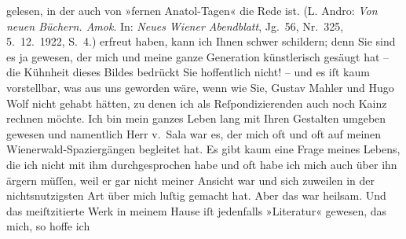 \begin{ledgroupsized}[t]{13cm}
{{{                  gelesen, in der auch von »fernen Anatol-Tagen« die Rede ist. (L. Andro: \emph{Von neuen Büchern. Amok}. In: \emph{Neues Wiener Abendblatt}, Jg. 56, Nr. 325,
                        5. 12. 1922, S. 4.)}}}\label{K_L02572-1h} erfreut haben, kann ich Ihnen
               schwer schildern; denn Sie sind es ja gewesen, der mich und meine ganze Generation
               künstlerisch gesäugt hat – die Kühnheit dieses Bildes bedrückt Sie hoffentlich nicht!
               – und es iſt kaum vorstellbar, was aus uns geworden wäre, wenn wie Sie, Gustav Mahler und Hugo Wolf nicht gehabt hätten, zu denen ich als
               Reſpondizierenden auch noch Kainz rechnen
               möchte. Ich bin mein ganzes Leben lang \strikeout{\textcolor{gray}{viel}} mit Ihren Gestalten umgeben gewesen und namentlich Herr v. Sala war es, der mich oft und oft
               auf meinen Wienerwald-Spaziergängen begleitet
               hat. Es gibt kaum eine Frage meines Lebens, die ich nicht mit ihm durchgesprochen
               habe und oft habe ich mich auch über ihn ärgern müſſen, weil er gar nicht meiner
               Ansicht war und sich zuweilen in der nichtsnutzigsten Art über mich luſtig gemacht
               hat. Aber das war heilsam. Und das meiſtzitierte Werk in meinem Hause iſt jedenfalls
                  »Literatur« gewesen, das mich, so hoffe ich

\end{ledgroupsized}
